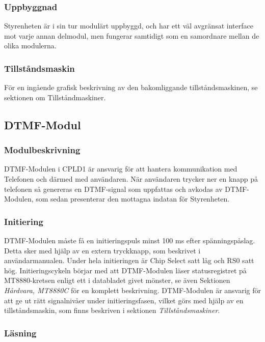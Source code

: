 \documentclass[a4paper,11pt]{article}
\begin{document}
	\subsubsection{Uppbyggnad}

	Styrenheten är i sin tur modulärt uppbyggd, och har ett väl avgränsat interface mot varje annan delmodul, men
	fungerar samtidigt som en samordnare mellan de olika modulerna.

	\subsubsection{Tillståndsmaskin}

	För en ingående grafisk beskrivning av den bakomliggande tillståndsmaskinen, se sektionen om Tillståndmaskiner.

	\subsection{DTMF-Modul}
		
	\subsubsection{Modulbeskrivning}

	DTMF-Modulen i CPLD1 är ansvarig för att hantera kommunikation med Telefonen och därmed med användaren.
	När användaren trycker ner en knapp på telefonen så genereras en DTMF-signal som uppfattas och avkodas
	av DTMF-Modulen, som sedan presenterar den mottagna indatan för Styrenheten.
		
	\subsubsection{Initiering}

	DTMF-Modulen måste få en initieringspuls minst 100 ms efter spänningspåslag. Detta sker med hjälp av
	en extern tryckknapp, som beskrivet i användarmanualen. Under hela initieringen är Chip Select satt låg
	och RS0 satt hög. Initieringscykeln börjar med att DTMF-Modulen läser statusregistret på MT8880-kretsen enligt ett 		i databladet givet mönster, se även Sektionen {\it Hårdvara, MT8880C} för en komplett beskrivning.
	DTMF-Modulen är ansvarig för att ge ut rätt signalnivåer under initieringsfasen, vilket görs med hjälp av en
	tillståndsmaskin, som finns beskriven i sektionen {\it Tillståndsmaskiner}.
		
	\subsubsection{Läsning}
\end{document}
